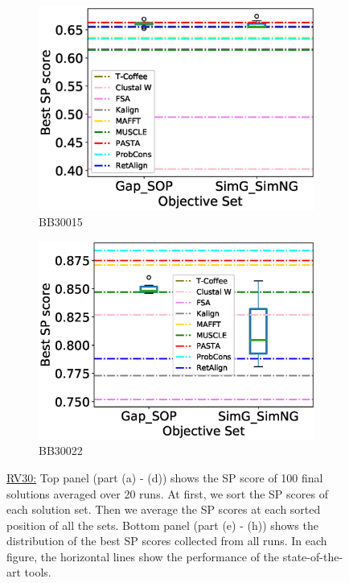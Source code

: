 \begin{figure}[!htbp]
\begin{adjustwidth}{-1cm}{-1cm}
\begin{subfigure}{0.22\textwidth}
			\includegraphics[width=\columnwidth]{Figure/summary/precomputedInit/Balibase/BB30015_objset_pairs_rank_2}
			\caption{BB30015}
		\end{subfigure}
		\begin{subfigure}{0.22\textwidth}
			\includegraphics[width=\columnwidth]{Figure/summary/precomputedInit/Balibase/BB30022_objset_pairs_rank_2}
			\caption{BB30022}
		\end{subfigure}
		\end{adjustwidth}
		\caption[SP score results on RV30]{\underline{RV30:} Top panel (part (a) - (d)) shows the SP score of 100 final solutions averaged over 20 runs. At first, we sort the SP scores of each solution set. Then we average the SP scores at each sorted position of all the sets. Bottom panel (part (e) - (h)) shows the distribution of the best SP scores collected from all runs. In each figure, the horizontal lines show the performance of the state-of-the-art tools.}
		\label{fig:rv30_sp}

\end{figure}


